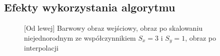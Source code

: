 \documentclass[a4paper,12pt, titlepage]{report}
\begin{document}
\subsection*{Efekty wykorzystania algorytmu}
\begin{figure}[h]
    \centering
    \caption{[Od lewej] Barwowy obraz wejściowy, obraz po skalowaniu niejednorodnym ze współczynnikiem \(S_{x}=3\) i  \(S_{y}=1\), obraz po interpolacji}%
    \label{fig:geo_after_grey1}%
\end{figure}
\FloatBarrier
\end{document}
